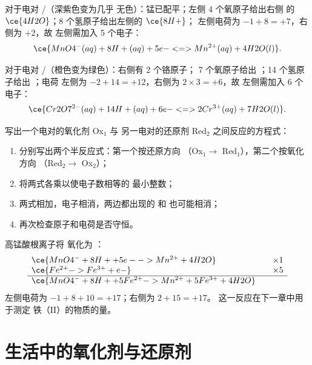 \begin{example}[高锰酸根离子]\label{ex:g11:redox:permanganate}
对于电对 /（深紫色变为几乎
无色）：锰已配平；左侧 4 个氧原子给出右侧
的 $\ce{4H2O}$；8 个氢原子给出左侧的 $\ce{8H+}$；
左侧电荷为 $-1 + 8 = +7$，右侧为 $+2$，故
左侧需加入 5 个电子：
\[
  \ce{MnO4^-(aq) + 8H+(aq) + 5e- <=> Mn^{2+}(aq) + 4H2O(l)}.
\]
\end{example}

\begin{example}[重铬酸根离子]\label{ex:g11:redox:dichromate}
对于电对 /（橙色变为绿色）：右侧有 2 个铬原子；
7 个氧原子给出 ；14 个氢原子给出 ；电荷
左侧为 $-2 + 14 = +12$，右侧为 $2 \times 3 = +6$，故
左侧需加入 6 个电子：
\[
  \ce{Cr2O7^{2-}(aq) + 14H+(aq) + 6e- <=> 2Cr^{3+}(aq) + 7H2O(l)}.
\]
\end{example}

\begin{method}[写出氧化还原方程式]\label{met:g11:redox:combine}
写出一个电对的氧化剂 Ox$_1$ 与
另一电对的还原剂 Red$_2$ 之间反应的方程式：
\begin{enumerate}
  \item 分别写出两个半反应式：第一个按还原方向
        （Ox$_1 \to$ Red$_1$），第二个按氧化方向
        （Red$_2 \to$ Ox$_2$）；
  \item 将两式各乘以使电子数相等的
        最小整数；
  \item 两式相加，电子相消，两边都出现的  和
         也可能相消；
  \item 再次检查原子和电荷是否守恒。
\end{enumerate}
\end{method}

\begin{example}[高锰酸根与铁（II）]\label{ex:g11:redox:mno4-fe}
高锰酸根离子将  氧化为 ：
\[
\begin{array}{l@{\qquad}l}
  \ce{MnO4^- + 8H+ + 5e- -> Mn^{2+} + 4H2O} & \times 1\\
  \ce{Fe^{2+} -> Fe^{3+} + e-} & \times 5\\
  \hline
  \ce{MnO4^- + 8H+ + 5Fe^{2+} -> Mn^{2+} + 5Fe^{3+} + 4H2O} &
\end{array}
\]
左侧电荷为 $-1 + 8 + 10 = +17$；右侧为 $2 + 15 = +17$。
这一反应在下一章中用于测定
铁（II）的物质的量。
\end{example}

\section{生活中的氧化剂与还原剂}

